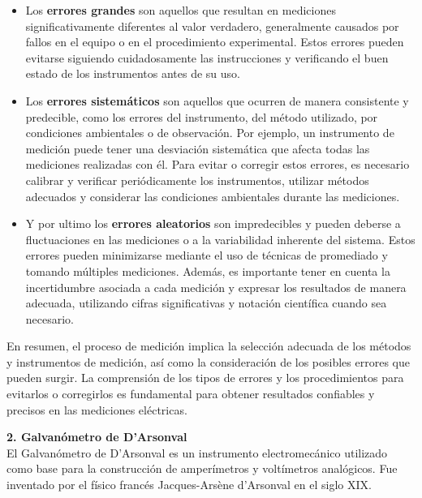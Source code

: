 \documentclass[12pt]{article}
\begin{document}
	\begin{itemize}
		\item Los \textbf{errores grandes} son aquellos que resultan en mediciones significativamente diferentes al valor verdadero, generalmente causados por fallos en el equipo o en el procedimiento experimental. Estos errores pueden evitarse siguiendo cuidadosamente las instrucciones y verificando el buen estado de los instrumentos antes de su uso.\\
	
		\item Los \textbf{errores sistemáticos} son aquellos que ocurren de manera consistente y predecible, como los errores del instrumento, del método utilizado, por condiciones ambientales o de observación. Por ejemplo, un instrumento de medición puede tener una desviación sistemática que afecta todas las mediciones realizadas con él. Para evitar o corregir estos errores, es necesario calibrar y verificar periódicamente los instrumentos, utilizar métodos adecuados y considerar las condiciones ambientales durante las mediciones.\\
	
		\item Y por ultimo los \textbf{errores aleatorios} son impredecibles y pueden deberse a fluctuaciones en las mediciones o a la variabilidad inherente del sistema. Estos errores pueden minimizarse mediante el uso de técnicas de promediado y tomando múltiples mediciones. Además, es importante tener en cuenta la incertidumbre asociada a cada medición y expresar los resultados de manera adecuada, utilizando cifras significativas y notación científica cuando sea necesario.\\
	
	\end{itemize}
	
	En resumen, el proceso de medición implica la selección adecuada de los métodos y instrumentos de medición, así como la consideración de los posibles errores que pueden surgir. La comprensión de los tipos de errores y los procedimientos para evitarlos o corregirlos es fundamental para obtener resultados confiables y precisos en las mediciones eléctricas.
	
	\textbf{2. Galvanómetro de D'Arsonval}\\
	
	El Galvanómetro de D'Arsonval es un instrumento electromecánico utilizado como base para la construcción de amperímetros y voltímetros analógicos. Fue inventado por el físico francés Jacques-Arsène d'Arsonval en el siglo XIX.\\
	
\end{document}
